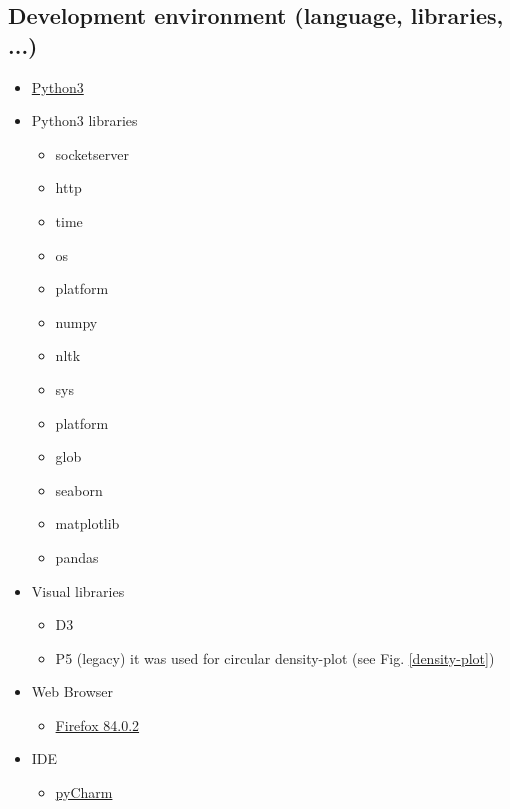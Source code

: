 \documentclass[runningheads]{llncs}
\begin{document}
\subsection{Development environment (language, libraries, ...)}

\begin{itemize}
    \item \href{https://www.python.org/downloads/}{Python3}
    \item Python3 libraries
    \begin{itemize}
        \item socketserver
        \item http
        \item time
        \item os
        \item platform
        \item numpy
        \item nltk
        \item sys
        \item platform
        \item glob
        \item seaborn
        \item matplotlib
        \item pandas
    \end{itemize}
    \item Visual libraries 
    \begin{itemize}
        \item D3
        \item P5 (legacy) it was used for circular density-plot (see Fig. \ref{density-plot})
    \end{itemize}
    \item Web Browser
    \begin{itemize}
        \item \href{https://www.mozilla.org/de/firefox/new/}{Firefox 84.0.2}
    \end{itemize}
    \item IDE
    \begin{itemize}
        \item \href{https://www.jetbrains.com/de-de/pycharm/}{pyCharm}
    \end{itemize}
\end{itemize}


\end{document}
